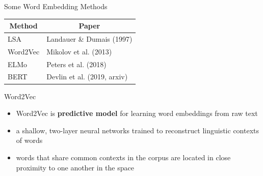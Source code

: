 \documentclass[professionalfonts, xcolor={usenames,svgnames,x11names,table}]{beamer}
\begin{document}
\begin{frame}{Some Word Embedding Methods}
\centering 

\begin{table}[]
\begin{tabular}{ll}
\hline
\multicolumn{1}{c}{Method} & \multicolumn{1}{c}{Paper}   \\ \hline  \hline
LSA                        & Landauer \& Dumais (1997)   \\
Word2Vec                   & Mikolov et al.  (2013)      \\
ELMo                       & Peters et al.  (2018)       \\
BERT                       & Devlin et al. (2019, arxiv) \\ \hline
\end{tabular}
\end{table}

\pause
\begin{alertblock}{Word2Vec}
\begin{itemize}
	\item Word2Vec is  \textbf{predictive model} for learning word embeddings from raw text
	\item  a shallow, two-layer neural networks trained to reconstruct linguistic contexts of words
	\item words that share common contexts in the corpus are located in close proximity to one another in the space
\end{itemize}
\end{alertblock}

\end{frame}
\end{document}
